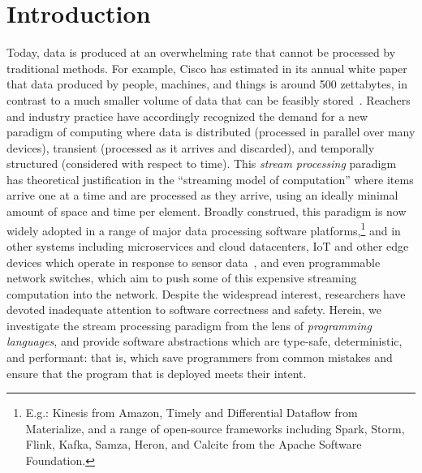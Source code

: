\section{Introduction}
\label{sec:intro}

Today, data is produced at an overwhelming rate
that cannot be processed by traditional methods.
For example, Cisco has estimated in its annual white paper
that data produced by people, machines, and things
is around 500 zettabytes, in contrast to a much smaller volume
of data that can be feasibly stored~\cite{index2018forecast}.
Reachers and industry practice have accordingly recognized the demand
for a new paradigm of computing where data is
distributed (processed in parallel over many devices),
transient (processed as it arrives and discarded),
and temporally structured (considered with respect to time).
This \emph{stream processing} paradigm has theoretical justification in the ``streaming model of computation''
where items arrive one at a time and are processed as they arrive, using
an ideally minimal amount of space and time per element.
Broadly construed, this paradigm
is now widely adopted in a range of major
data processing software platforms,\footnote{E.g.: Kinesis from Amazon, Timely and Differential Dataflow from Materialize, and a range of open-source frameworks including Spark, Storm, Flink, Kafka, Samza, Heron, and Calcite from the Apache Software Foundation.} and in other systems including microservices and
cloud datacenters, IoT and other edge devices which operate in response
to sensor data~\cite{shi2016edge, ashton2009internet}, and even programmable network switches,
which aim to push some of this expensive streaming computation
into the network.
Despite the widespread interest, researchers have devoted inadequate attention to software correctness and safety.
Herein, we investigate the stream processing paradigm from the lens of \emph{programming languages}, and provide software abstractions which are type-safe, deterministic, and performant: that is, which save programmers from common mistakes and ensure that the program that is deployed meets their intent.




